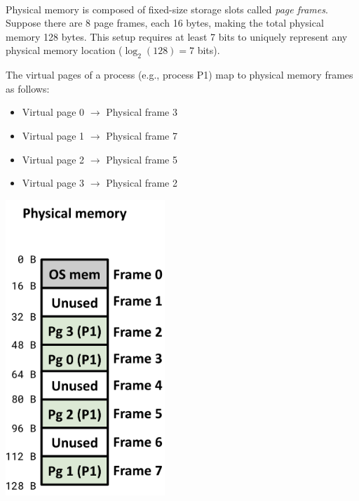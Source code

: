 \begin{example}
\leavevmode
\\[2px]
Physical memory is composed of fixed-size storage slots called \textit{page frames}. Suppose there are 8 page frames, each 16 bytes, making the total physical memory 128 bytes. This setup requires at least 7 bits to uniquely represent any physical memory location ($\log_2(128) = 7$ bits). \\
\noindent
\begin{minipage}{0.45\textwidth}
The virtual pages of a process (e.g., process P1) map to physical memory frames as follows:\\

\begin{itemize}
  \item Virtual page 0 $\rightarrow$ Physical frame 3
  \item Virtual page 1 $\rightarrow$ Physical frame 7
  \item Virtual page 2 $\rightarrow$ Physical frame 5
  \item Virtual page 3 $\rightarrow$ Physical frame 2
\end{itemize}
\end{minipage}%
\hfill
\vline
\hfill
\begin{minipage}{0.45\textwidth}
\begin{center}
  \includegraphics[width=0.45\textwidth]{chapters/L5/images/paging-example2.png}
\end{center}
\end{minipage}
\\

\end{example}

